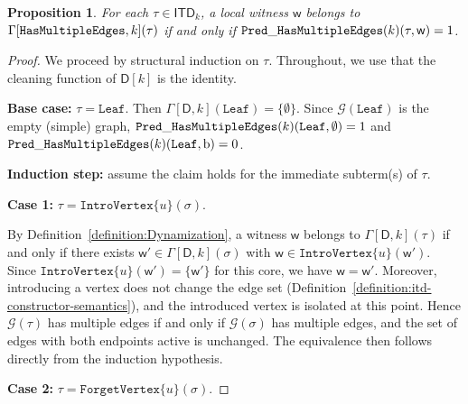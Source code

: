 \documentclass[11pt,a4paper]{article}
\newtheorem{proposition}[theorem]{Proposition}
\newcommand{\falsevalue}{0}
\newcommand{\truevalue}{1}
\newcommand{\treewidthvalue}{k}
\newcommand{\decompositiongraph}[1]{\mathcal{G}(#1)}
\newcommand{\introvertextype}[1]{\mathtt{IntroVertex}\{#1\}}
\newcommand{\forgetvertextype}[1]{\mathtt{ForgetVertex}\{#1\}}
\newcommand{\leaftype}{\mathtt{Leaf}}
\newcommand{\allabstractdecompositionstreewidth}[1]{\mathsf{ITD}_{#1}}
\newcommand{\abstractdecomposition}{\tau}
\newcommand{\sigmaabstractdecomposition}{\sigma}
\newcommand{\vertexone}{u}
\newcommand{\awitness}{\mathsf{w}}
\newcommand{\dpcore}{\mathsf{D}}
\newcommand{\dpNamePart}[1]{\mbox{\normalfont\ttfamily #1}}
\newcommand{\predicateHasMultiEdge}[1]{\dpNamePart{Pred}\_\allowbreak\dpNamePart{HasMultipleEdges}(#1)}
\newcommand{\hasMultiEdgeCore}{\dpNamePart{HasMultipleEdges}}
\newcommand{\dynamizationfunctionname}[1]{\Gamma[{#1}]}
\newcommand{\dynamizationfunction}[2]{\dynamizationfunctionname{#1,#2}}
\newcommand{\multiedgefound}{\mathrm{b}}
\begin{document}
{	\begin{proposition}
		\label{proposition:PredicateHasMultiEdgeCorrectness}
		For each \(\abstractdecomposition \in \allabstractdecompositionstreewidth{\treewidthvalue}\),
		a local witness \(\awitness\) belongs to \(\dynamizationfunction{\hasMultiEdgeCore}{\treewidthvalue}(\abstractdecomposition)\)
		if and only if \(\predicateHasMultiEdge{\treewidthvalue}(\abstractdecomposition,\awitness) = \truevalue\).
		\end{proposition}

		\begin{proof}
		We proceed by structural induction on \(\abstractdecomposition\). Throughout, we use that the cleaning function of \(\dpcore[\treewidthvalue]\) is the identity.

		\medskip
		\noindent\textbf{Base case:} \(\abstractdecomposition=\leaftype\). Then \(\dynamizationfunction{\dpcore}{\treewidthvalue}(\leaftype)=\{\emptyset\}\). Since \(\decompositiongraph{\leaftype}\) is the empty (simple) graph, \(\predicateHasMultiEdge{\treewidthvalue}(\leaftype,\emptyset)=\truevalue\) and \(\predicateHasMultiEdge{\treewidthvalue}(\leaftype,\multiedgefound)=\falsevalue\).

		\medskip
		\noindent\textbf{Induction step:} assume the claim holds for the immediate subterm(s) of \(\abstractdecomposition\).

		\medskip
			\noindent\textbf{Case 1:} \(\abstractdecomposition=\introvertextype{\vertexone}(\sigmaabstractdecomposition)\).

			By Definition~\ref{definition:Dynamization}, a witness \(\awitness\) belongs to \(\dynamizationfunction{\dpcore}{\treewidthvalue}(\abstractdecomposition)\) if and only if there exists \(\awitness'\in \dynamizationfunction{\dpcore}{\treewidthvalue}(\sigmaabstractdecomposition)\) with \(\awitness\in \introvertextype{\vertexone}(\awitness')\). Since \(\introvertextype{\vertexone}(\awitness')=\{\awitness'\}\) for this core, we have \(\awitness=\awitness'\). Moreover, introducing a vertex does not change the edge set (Definition~\ref{definition:itd-constructor-semantics}), and the introduced vertex is isolated at this point. Hence \(\decompositiongraph{\abstractdecomposition}\) has multiple edges if and only if \(\decompositiongraph{\sigmaabstractdecomposition}\) has multiple edges, and the set of edges with both endpoints active is unchanged. The equivalence then follows directly from the induction hypothesis.

		\medskip
		\noindent\textbf{Case 2:} \(\abstractdecomposition=\forgetvertextype{\vertexone}(\sigmaabstractdecomposition)\).


\end{proof}}
\end{document}
